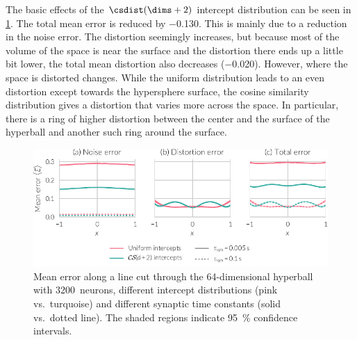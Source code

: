 The basic effects of the $\csdist(\dims + 2)$ intercept distribution can be seen in \cref{fig:error-cs-intercepts}.
The total mean error is reduced by \num{-0.130}.
This is mainly due to a reduction in the noise error.
The distortion seemingly increases, but because most of the volume of the space is near the surface and the distortion there ends up a little bit lower, the total mean distortion also decreases (\num{-0.020}).
However, where the space is distorted changes.
While the uniform distribution leads to an even distortion except towards the hypersphere surface, the cosine similarity distribution gives a distortion that varies more across the space.
In particular, there is a ring of higher distortion between the center and the surface of the hyperball and another such ring around the surface.
\begin{figure}
    \centering
    \includegraphics{figures/error-cs-intercepts}
    \caption[Mean error along line cut with different intercept distributions]{Mean error along a line cut through the 64-dimensional hyperball with \num{3200}~neurons, different intercept distributions (pink vs.\ turquoise) and different synaptic time constants (solid vs.\ dotted line). The shaded regions indicate \SI{95}{\percent} confidence intervals.}\label{fig:error-cs-intercepts}
\end{figure}

